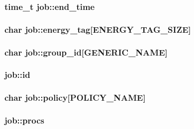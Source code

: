 \subsubsection[{\texorpdfstring{end\+\_\+time}{end_time}}]{\setlength{\rightskip}{0pt plus 5cm}time\+\_\+t job\+::end\+\_\+time}\hypertarget{structjob_a31733ff42c912ce3d700077efd63bcec}{}\label{structjob_a31733ff42c912ce3d700077efd63bcec}
\subsubsection[{\texorpdfstring{energy\+\_\+tag}{energy_tag}}]{\setlength{\rightskip}{0pt plus 5cm}char job\+::energy\+\_\+tag\mbox{[}{\bf E\+N\+E\+R\+G\+Y\+\_\+\+T\+A\+G\+\_\+\+S\+I\+ZE}\mbox{]}}\hypertarget{structjob_a5438f13c919dcb9081d3205a78c14aad}{}\label{structjob_a5438f13c919dcb9081d3205a78c14aad}
\subsubsection[{\texorpdfstring{group\+\_\+id}{group_id}}]{\setlength{\rightskip}{0pt plus 5cm}char job\+::group\+\_\+id\mbox{[}{\bf G\+E\+N\+E\+R\+I\+C\+\_\+\+N\+A\+ME}\mbox{]}}\hypertarget{structjob_a9a9fda8b920aa7005ad6e61f1660bbcb}{}\label{structjob_a9a9fda8b920aa7005ad6e61f1660bbcb}
\subsubsection[{\texorpdfstring{id}{id}}]{ job\+::id}\hypertarget{structjob_a7cb6b79b4033fbd0b8ab22ce6b9047a8}{}\label{structjob_a7cb6b79b4033fbd0b8ab22ce6b9047a8}
\subsubsection[{\texorpdfstring{policy}{policy}}]{\setlength{\rightskip}{0pt plus 5cm}char job\+::policy\mbox{[}{\bf P\+O\+L\+I\+C\+Y\+\_\+\+N\+A\+ME}\mbox{]}}\hypertarget{structjob_a827d48e89d46aa77e089f11b64c6a7b1}{}\label{structjob_a827d48e89d46aa77e089f11b64c6a7b1}
\subsubsection[{\texorpdfstring{procs}{procs}}]{ job\+::procs}\hypertarget{structjob_aacbd58284400b92738096e855aad60cc}{}\label{structjob_aacbd58284400b92738096e855aad60cc}
